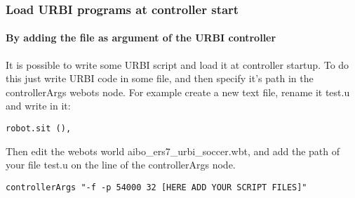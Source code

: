 \subsubsection{Load URBI programs at controller start}
\label{webots.firstrun.loadprograms}%

\paragraph{By adding the file as argument of the URBI controller}
\label{webots.firstrun.loadprograms.cmd_line}%

It is possible to write some URBI script and load it at controller
startup.  To do this just write URBI code in some file, and then
specify it's path in the controllerArgs webots node.  For example
create a new text file, rename it test.u and write in it:


\begin{lstlisting}
robot.sit (),
\end{lstlisting}

Then edit the webots world aibo\_ers7\_urbi\_soccer.wbt, and add the
path of your file test.u on the line of the controllerArgs node.


\begin{lstlisting}
controllerArgs "-f -p 54000 32 [HERE ADD YOUR SCRIPT FILES]"
\end{lstlisting}

